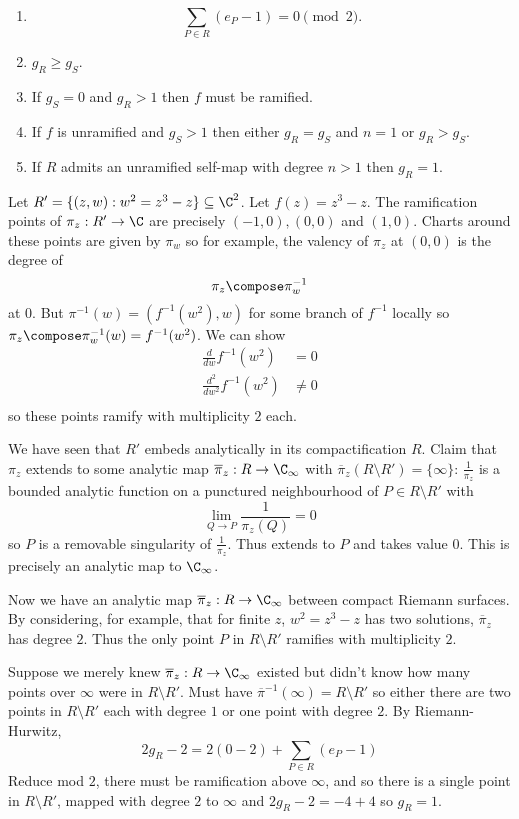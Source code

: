 \documentclass[a4paper]{article}
\begin{document}
\begin{corollary}\leavevmode
  \begin{enumerate}
  \item
    \[
      \sum_{P \in R}(e_P - 1) = 0 \pmod 2.
    \]
  \item \(g_R \geq g_S\).
  \item If \(g_S = 0\) and \(g_R > 1\) then \(f\) must be ramified.
  \item If \(f\) is unramified and \(g_S > 1\) then either \(g_R = g_S\) and \(n = 1\) or \(g_R > g_S\).
  \item If \(R\) admits an unramified self-map with degree \(n > 1\) then \(g_R = 1\).
  \end{enumerate}
\end{corollary}

\begin{eg}
  Let \(R' = \{(z, w): w^2 = z^3 - z\} \subseteq \C^2\). Let \(f(z) = z^3 - z\). The ramification points of \(\pi_z: R' \to \C\) are precisely \((-1, 0), (0, 0)\) and \((1, 0)\). Charts around these points are given by \(\pi_w\) so for example, the valency of \(\pi_z\) at \((0, 0)\) is the degree of
  \[
    \pi_z \compose \pi_w^{-1}
  \]
  at \(0\). But \(\pi^{-1}(w) = (f^{-1}(w^2), w)\) for some branch of \(f^{-1}\) locally so \(\pi_z \compose \pi_w^{-1}(w) = f^{-1}(w^2)\). We can show
  \begin{align*}
    \frac{d}{dw} f^{-1}(w^2) &= 0 \\
    \frac{d^2}{dw^2} f^{-1}(w^2) &\neq 0 \\
  \end{align*}
  so these points ramify with multiplicity \(2\) each.

  We have seen that \(R'\) embeds analytically in its compactification \(R\). Claim that \(\pi_z\) extends to some analytic map \(\overline \pi_z: R \to \C_\infty\) with \(\overline \pi_z(R \setminus R') = \{\infty\}\): \(\frac{1}{\pi_z}\) is a bounded analytic function on a punctured neighbourhood of \(P \in R \setminus R'\) with
  \[
    \lim_{Q \to P} \frac{1}{\pi_z(Q)} = 0
  \]
  so \(P\) is a removable singularity of \(\frac{1}{\pi_z}\). Thus extends to \(P\) and takes value \(0\). This is precisely an analytic map to \(\C_\infty\).

  Now we have an analytic map \(\overline \pi_z: R \to \C_\infty\) between compact Riemann surfaces. By considering, for example, that for finite \(z\), \(w^2 = z^3 - z\) has two solutions, \(\overline \pi_z\) has degree \(2\). Thus the only point \(P\) in \(R \setminus R'\) ramifies with multiplicity \(2\).

  Suppose we merely knew \(\overline \pi_z: R \to \C_\infty\) existed but didn't know how many points over \(\infty\) were in \(R \setminus R'\). Must have \(\overline \pi^{-1}(\infty) = R \setminus R'\) so either there are two points in \(R \setminus R'\) each with degree \(1\) or one point with degree \(2\). By Riemann-Hurwitz,
  \[
    2g_R - 2 = 2(0 - 2) + \sum_{P \in R} (e_P - 1)
  \]
  Reduce mod \(2\), there must be ramification above \(\infty\), and so there is a single point in \(R \setminus R'\), mapped with degree \(2\) to \(\infty\) and \(2g_R - 2 = -4 + 4\) so \(g_R = 1\).
\end{eg}
\end{document}
